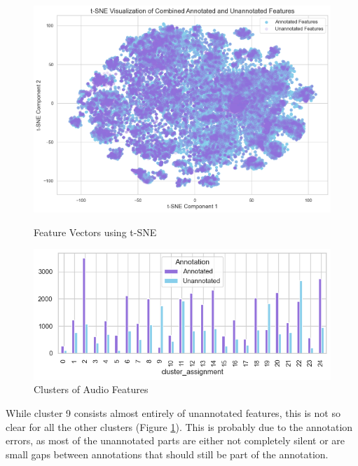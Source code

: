 \begin{figure}[h]
  \centering
  \begin{minipage}[b]{0.49\textwidth}
    \centering
    \includegraphics[width=\textwidth]{figs/Audio Features T-SNE.png}
    \caption{Feature Vectors using t-SNE}
    \label{fig:Audio Features t-SNE}
  \end{minipage}
  \hfill
  \begin{minipage}[b]{0.49\textwidth}
    \centering
    \includegraphics[width=\textwidth]{figs/Clustered Audio Features.png}
    \caption{Clusters of Audio Features}
    \label{fig:Audio Feature Clusters}
  \end{minipage}
\end{figure}

While cluster 9 consists almost entirely of unannotated features, this is not so clear for all the other clusters (Figure \ref{fig:Audio Feature Clusters}). This is probably due to the annotation errors, as most of the unannotated parts are either not completely silent or are small gaps between annotations that should still be part of the annotation. 

